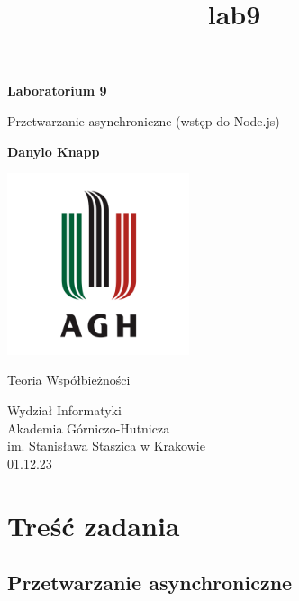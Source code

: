 \documentclass[11pt]{article}
\title{lab9}
\begin{document}
    
    \begin{titlepage}
        \begin{center}
            \vspace*{1cm}
    
            \textbf{Laboratorium 9}
    
            \vspace{0.5cm}
            Przetwarzanie asynchroniczne (wstęp do Node.js)
            
            \vspace{1.5cm}
    
            \textbf{Danylo Knapp}

            \vfill

            \includegraphics[width=0.4\textwidth]{../report-templates/agh-logo.png}
    
            \vfill
                
            Teoria Współbieżności
                
            \vspace{0.8cm}

            Wydział Informatyki\\
            Akademia Górniczo-Hutnicza\\
            im. Stanisława Staszica w Krakowie\\
            01.12.23
                
        \end{center}
    \end{titlepage}
    
    

    
    \hypertarget{treux15bux107-zadania}{%
\section{Treść zadania}\label{treux15bux107-zadania}}

\hypertarget{przetwarzanie-asynchroniczne}{%
\subsection{Przetwarzanie
asynchroniczne}\label{przetwarzanie-asynchroniczne}}
\end{document}
